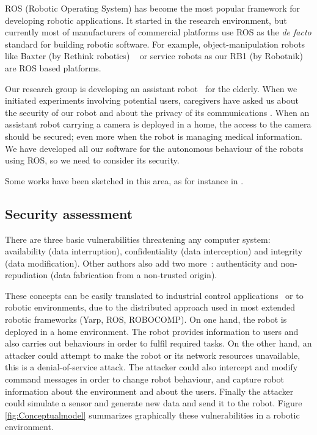 \documentclass[journal,twoside]{JoPhA}
\begin{document}
ROS (Robotic Operating System) \cite{ROS09} has become the most popular framework for developing robotic applications. It started in the research environment, but currently most of manufacturers of commercial platforms use ROS as the {\em de facto} standard for building robotic software. For example, object-manipulation robots like Baxter (by Rethink robotics) ~\cite{fitzgerald2013developing} or service robots as our RB1 (by Robotnik) are ROS based platforms.

Our research group is developing an assistant robot~\cite{Martin2014} for the elderly. When we initiated experiments involving potential users, caregivers have asked us about the security of our robot and about the privacy of its communications \cite{Denning2009}. When an assistant robot carrying a camera is deployed in a home, the access to the camera should be secured; even more when the robot is managing medical information. We have developed all our software for the autonomous behaviour of the robots using ROS, so we need to consider its security.

Some works have been sketched in this area, as for instance in \cite{Guiochet2016}.



\subsection{Security assessment}

There are three basic vulnerabilities threatening any computer system: availability (data interruption), confidentiality (data interception) and integrity (data modification). Other authors also add two more~\cite{sattarova2007security}: authenticity and non-repudiation (data fabrication from a non-trusted origin). 

These concepts can be easily translated to industrial control applications~\cite{huitsing2008attack} or to robotic environments, due to the distributed approach used in most extended robotic frameworks (Yarp, ROS, ROBOCOMP). On one hand, the robot is deployed in a home environment. The robot provides information to users and also carries out behaviours in order to fulfil required tasks. 
On the other hand, an attacker could attempt to make the robot or its network resources unavailable, this is a denial-of-service attack. The attacker could also intercept and modify command messages in order to change robot behaviour, and capture robot information about the environment and about the users. Finally the attacker could simulate a sensor and generate new data and send it to the robot. Figure \ref{fig:Conceptualmodel} summarizes graphically these vulnerabilities in a robotic environment.
\end{document}
